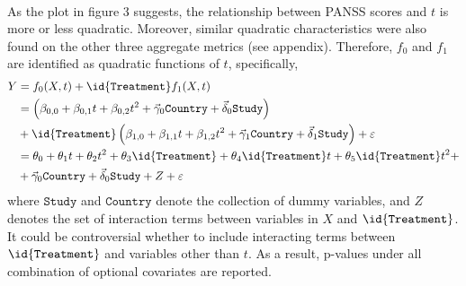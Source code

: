\documentclass[11pt]{article}
\begin{document}
	\paragraph{} As the plot in figure 3 suggests, the relationship between PANSS scores and $t$ is more or less quadratic. Moreover, similar quadratic characteristics were also found on the other three aggregate metrics (see appendix). Therefore, $f_0$ and $f_1$ are identified as quadratic functions of $t$, specifically,
	\begin{align}
		Y &= f_0(X, t) + \id{\texttt{Treatment}} f_1(X, t) \\
		&= \left(\beta_{0, 0} + \beta_{0, 1} t + \beta_{0, 2} t^2 + \vec{\gamma}_0 \texttt{Country} + \vec{\delta}_0 \texttt{Study}\right) \\
		&+ \id{\texttt{Treatment}} \left(\beta_{1, 0} + \beta_{1, 1} t + \beta_{1, 2} t^2 + \vec{\gamma}_1 \texttt{Country} + \vec{\delta}_1 \texttt{Study}\right) + \varepsilon \\
		&= \theta_0 + \theta_1 t + \theta_2 t^2 + \theta_3 \id{\texttt{Treatment}} + \theta_4 \id{\texttt{Treatment}} t + \theta_5 \id{\texttt{Treatment}} t^2 + \\
		&+\vec{\gamma}_0 \texttt{Country} + \vec{\delta}_0 \texttt{Study} + Z + \varepsilon
	\end{align}
	where $\texttt{Study}$ and $\texttt{Country}$ denote the collection of dummy variables, and $Z$ denotes the set of interaction terms between variables in $X$ and $\id{\texttt{Treatment}}$. It could be controversial whether to include interacting terms between $\id{\texttt{Treatment}}$ and variables other than $t$. As a result, p-values under all combination of optional covariates are reported.
	
\end{document}

